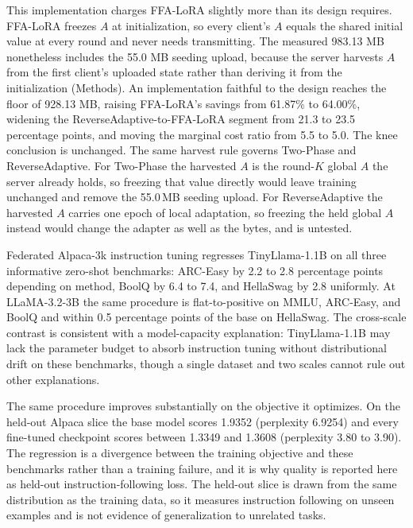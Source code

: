 \documentclass[pdflatex,sn-nature,lineno]{sn-jnl}
\begin{document}
This implementation charges FFA-LoRA slightly more than its design requires. FFA-LoRA freezes $A$ at initialization, so every client's $A$ equals the shared initial value at every round and never needs transmitting. The measured 983.13 MB nonetheless includes the 55.0 MB seeding upload, because the server harvests $A$ from the first client's uploaded state rather than deriving it from the initialization (Methods). An implementation faithful to the design reaches the floor of 928.13 MB, raising FFA-LoRA's savings from 61.87\% to 64.00\%, widening the ReverseAdaptive-to-FFA-LoRA segment from 21.3 to 23.5 percentage points, and moving the marginal cost ratio from 5.5 to 5.0. The knee conclusion is unchanged. The same harvest rule governs Two-Phase and ReverseAdaptive. For Two-Phase the harvested $A$ is the round-$K$ global $A$ the server already holds, so freezing that value directly would leave training unchanged and remove the 55.0\,MB seeding upload. For ReverseAdaptive the harvested $A$ carries one epoch of local adaptation, so freezing the held global $A$ instead would change the adapter as well as the bytes, and is untested.

\label{sec:baseregression}
Federated Alpaca-3k \cite{taori2023alpaca} instruction tuning regresses TinyLlama-1.1B \cite{zhang2024tinyllama} on all three informative zero-shot benchmarks: ARC-Easy by 2.2 to 2.8 percentage points depending on method, BoolQ by 6.4 to 7.4, and HellaSwag by 2.8 uniformly. At LLaMA-3.2-3B \cite{dubey2024llama3} the same procedure is flat-to-positive on MMLU, ARC-Easy, and BoolQ and within 0.5 percentage points of the base on HellaSwag. The cross-scale contrast is consistent with a model-capacity explanation: TinyLlama-1.1B may lack the parameter budget to absorb instruction tuning without distributional drift on these benchmarks, though a single dataset and two scales cannot rule out other explanations.

The same procedure improves substantially on the objective it optimizes. On the held-out Alpaca slice the base model scores 1.9352 (perplexity 6.9254) and every fine-tuned checkpoint scores between 1.3349 and 1.3608 (perplexity 3.80 to 3.90). The regression is a divergence between the training objective and these benchmarks rather than a training failure, and it is why quality is reported here as held-out instruction-following loss. The held-out slice is drawn from the same distribution as the training data, so it measures instruction following on unseen examples and is not evidence of generalization to unrelated tasks.
\end{document}
